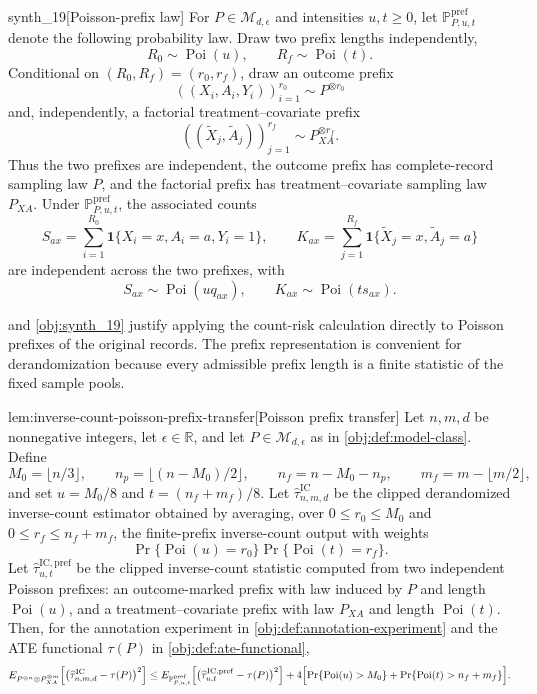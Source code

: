 \begin{definitionv}{synth_19}[Poisson-prefix law]
For \(P\in\mathcal M_{d,\epsilon}\) and intensities \(u,t\ge0\), let \(\mathbb P^{\mathrm{pref}}_{P,u,t}\) denote the following probability law. Draw two prefix lengths independently,
\[
R_0\sim \operatorname{Poi}(u),\qquad R_f\sim \operatorname{Poi}(t).
\]
Conditional on \((R_0,R_f)=(r_0,r_f)\), draw an outcome prefix
\[
((X_i,A_i,Y_i))_{i=1}^{r_0}\sim P^{\otimes r_0}
\]
and, independently, a factorial treatment--covariate prefix
\[
((\widetilde X_j,\widetilde A_j))_{j=1}^{r_f}\sim P_{XA}^{\otimes r_f}.
\]
Thus the two prefixes are independent, the outcome prefix has complete-record sampling law \(P\), and the factorial prefix has treatment--covariate sampling law \(P_{XA}\). Under \(\mathbb P^{\mathrm{pref}}_{P,u,t}\), the associated counts
\[
S_{ax}=\sum_{i=1}^{R_0}\mathbf 1\{X_i=x,A_i=a,Y_i=1\},
\qquad
K_{ax}=\sum_{j=1}^{R_f}\mathbf 1\{\widetilde X_j=x,\widetilde A_j=a\}
\]
are independent across the two prefixes, with
\[
S_{ax}\sim\operatorname{Poi}(u q_{ax}),\qquad
K_{ax}\sim\operatorname{Poi}(t s_{ax}).
\]
\end{definitionv}

 and \cref{obj:synth_19} justify applying the count-risk calculation directly to Poisson prefixes of the original records. The prefix representation is convenient for derandomization because every admissible prefix length is a finite statistic of the fixed sample pools.

\begin{lemmav}{lem:inverse-count-poisson-prefix-transfer}[Poisson prefix transfer]
Let \(n,m,d\) be nonnegative integers, let \(\epsilon\in\mathbb R\), and let \(P\in\mathcal M_{d,\epsilon}\) as in \cref{obj:def:model-class}.  Define
\[
M_0=\bigl\lfloor n/3\bigr\rfloor,\qquad
n_p=\bigl\lfloor (n-M_0)/2\bigr\rfloor,\qquad
n_f=n-M_0-n_p,\qquad
m_f=m-\bigl\lfloor m/2\bigr\rfloor,
\]
and set \(u=M_0/8\) and \(t=(n_f+m_f)/8\).  Let \(\widehat\tau^{\mathrm{IC}}_{n,m,d}\) be the clipped derandomized inverse-count estimator obtained by averaging, over \(0\le r_0\le M_0\) and \(0\le r_f\le n_f+m_f\), the finite-prefix inverse-count output with weights
\[
\Pr\{\operatorname{Poi}(u)=r_0\}\Pr\{\operatorname{Poi}(t)=r_f\}.
\]
Let \(\widehat\tau^{\mathrm{IC,pref}}_{u,t}\) be the clipped inverse-count statistic computed from two independent Poisson prefixes: an outcome-marked prefix with law induced by \(P\) and length \(\operatorname{Poi}(u)\), and a treatment--covariate prefix with law \(P_{XA}\) and length \(\operatorname{Poi}(t)\).  Then, for the annotation experiment in \cref{obj:def:annotation-experiment} and the ATE functional \(\tau(P)\) in \cref{obj:def:ate-functional},
\[
E_{P^{\otimes n}\otimes P_{XA}^{\otimes m}}
\!\left[
  \bigl(\widehat\tau^{\mathrm{IC}}_{n,m,d}-\tau(P)\bigr)^2
\right]
\le
E_{\mathbb P^{\mathrm{pref}}_{P,u,t}}
\!\left[
  \bigl(\widehat\tau^{\mathrm{IC,pref}}_{u,t}-\tau(P)\bigr)^2
\right]
+4\Bigl[
  \Pr\{\operatorname{Poi}(u)>M_0\}
  +\Pr\{\operatorname{Poi}(t)>n_f+m_f\}
\Bigr].
\]
\end{lemmav}

